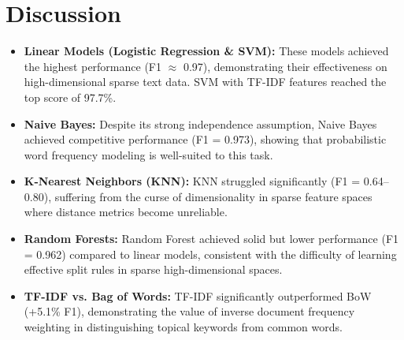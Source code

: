 \documentclass[12pt]{article}
\begin{document}

\section{Discussion}
\begin{itemize}
    \item \textbf{Linear Models (Logistic Regression \& SVM):} These models achieved the highest performance (F1 $\approx$ 0.97), demonstrating their effectiveness on high-dimensional sparse text data. SVM with TF-IDF features reached the top score of 97.7\%.

    \item \textbf{Naive Bayes:} Despite its strong independence assumption, Naive Bayes achieved competitive performance (F1 = 0.973), showing that probabilistic word frequency modeling is well-suited to this task.

    \item \textbf{K-Nearest Neighbors (KNN):} KNN struggled significantly (F1 = 0.64--0.80), suffering from the curse of dimensionality in sparse feature spaces where distance metrics become unreliable.

    \item \textbf{Random Forests:} Random Forest achieved solid but lower performance (F1 = 0.962) compared to linear models, consistent with the difficulty of learning effective split rules in sparse high-dimensional spaces.

    \item \textbf{TF-IDF vs. Bag of Words:} TF-IDF significantly outperformed BoW (+5.1\% F1), demonstrating the value of inverse document frequency weighting in distinguishing topical keywords from common words.
\end{itemize}
\end{document}
